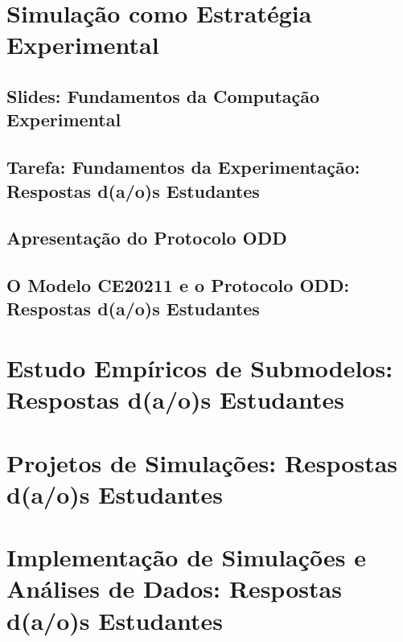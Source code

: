 \documentclass[12pt]{book}
\begin{document}


\part{Simulação como Estratégia Experimental}

\chapter{Slides: Fundamentos da Computação Experimental\label{fundamentos:ce}}



\chapter{Tarefa: Fundamentos da Experimentação: Respostas d(a/o)s Estudantes}

%

%

\chapter{Apresentação do Protocolo ODD\label{oddprotocol}}
	
%

\chapter{O Modelo CE20211 e o Protocolo ODD: Respostas d(a/o)s Estudantes}

%

%    

\part{Estudo Empíricos de Submodelos: Respostas d(a/o)s Estudantes}

%

\part{Projetos de Simulações: Respostas d(a/o)s Estudantes}

%

\part{Implementação de Simulações e Análises de Dados: Respostas d(a/o)s Estudantes}

%



\end{document}

